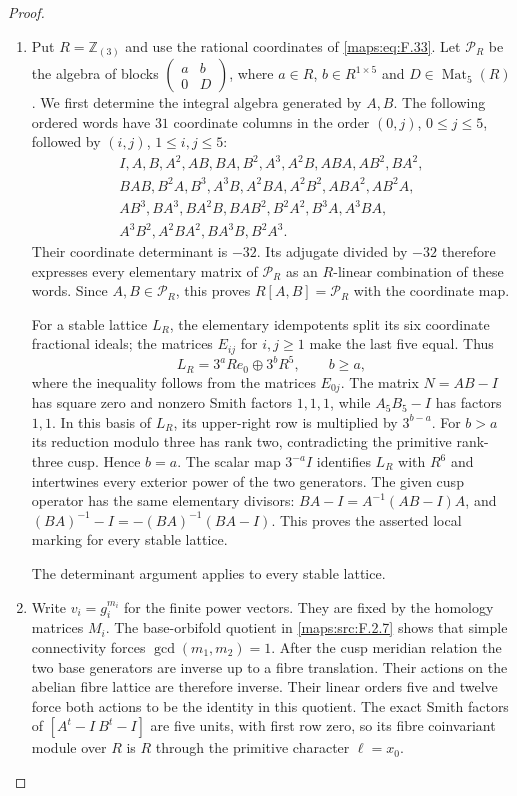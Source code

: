 \begin{proof}
\begin{enumerate}[label={$\langle1\rangle$\arabic*.}]
\item Put $R=\mathbb Z_{(3)}$ and use the rational coordinates of
\eqref{maps:eq:F.33}.  Let $\mathcal P_R$ be the algebra of blocks
$\left(\begin{smallmatrix}a&b\\0&D\end{smallmatrix}\right)$,
where $a\in R$, $b\in R^{1\times5}$ and $D\in\operatorname{Mat}_5(R)$.
We first determine the integral algebra generated by $A,B$.
The following ordered words have $31$ coordinate columns in the order
$(0,j)$, $0\leq j\leq5$, followed by $(i,j)$,
$1\leq i,j\leq5$:
\[
\begin{gathered}
I,A,B,A^2,AB,BA,B^2,A^3,A^2B,ABA,AB^2,BA^2,\\
BAB,B^2A,B^3,A^3B,A^2BA,A^2B^2,ABA^2,AB^2A,\\
AB^3,BA^3,BA^2B,BAB^2,B^2A^2,B^3A,A^3BA,\\
A^3B^2,A^2BA^2,BA^3B,B^2A^3.
\end{gathered}
\]
Their coordinate determinant is $-32$.  Its adjugate divided by
$-32$ therefore expresses every elementary matrix of
$\mathcal P_R$ as an $R$-linear combination of these words.
Since $A,B\in\mathcal P_R$, this proves
$R[A,B]=\mathcal P_R$ with the coordinate map.

For a stable lattice $L_R$, the elementary idempotents split its
six coordinate fractional ideals; the matrices $E_{ij}$ for
$i,j\geq1$ make the last five equal.  Thus
\[
 L_R=3^aRe_0\oplus3^bR^5,\qquad b\geq a,
\]
where the inequality follows from the matrices $E_{0j}$.
The matrix $N=AB-I$ has square zero and nonzero Smith factors
$1,1,1$, while $A_5B_5-I$ has factors $1,1$.
In this basis of $L_R$, its upper-right row is multiplied by
$3^{b-a}$.  For $b>a$ its reduction modulo three has rank two,
contradicting the primitive rank-three cusp.  Hence $b=a$.
The scalar map $3^{-a}I$ identifies $L_R$ with $R^6$
and intertwines every exterior power of the two generators.
The given cusp operator has the same elementary divisors:
$BA-I=A^{-1}(AB-I)A$, and
$(BA)^{-1}-I=-(BA)^{-1}(BA-I)$.
This proves the asserted local marking for every stable lattice.

The determinant argument applies to every stable lattice.

\item Write $v_i=g_i^{m_i}$ for the finite power vectors.
They are fixed by the homology matrices $M_i$.
The base-orbifold quotient in \cref{maps:src:F.2.7} shows that
simple connectivity forces $\gcd(m_1,m_2)=1$.
After the cusp meridian relation the two base generators are
inverse up to a fibre translation.  Their actions on the abelian
fibre lattice are therefore inverse.  Their linear orders five
and twelve force both actions to be the identity in this quotient.
The exact Smith factors of $[A^t-I\ B^t-I]$ are five units,
with first row zero, so its fibre coinvariant module over $R$
is $R$ through the primitive character $\ell=x_0$.


\end{enumerate}
\end{proof}
